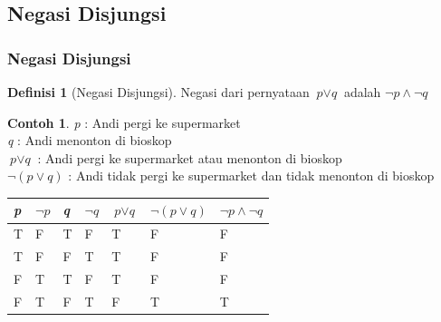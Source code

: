\documentclass[handout]{beamer}
\theoremstyle{definition}
\newtheorem{definisi}[theorem]{Definisi}
\theoremstyle{example}
\newtheorem{contoh}[theorem]{Contoh}
\begin{document}
\subsection{Negasi Disjungsi}
\begin{frame}
	\frametitle{Negasi Disjungsi}
    \begin{definisi}[Negasi Disjungsi]
    	Negasi dari pernyataan $\textit{p}\vee\textit{q}$  adalah $\neg\textit{p}\wedge\neg\textit{q}$    		 	
    \end{definisi}
    \begin{contoh}
    	\textit{p} : Andi pergi ke supermarket \\
    	\textit{q} : Andi menonton di bioskop \\
    	$\textit{p}\vee\textit{q}$ : Andi pergi ke supermarket atau menonton di bioskop\\
    	$\neg(\textit{p}\vee\textit{q})$ : Andi tidak pergi ke supermarket dan tidak menonton di bioskop	\\
    	
    	\begin{tabular}{ | l | l | l | l | l | l | l |}
    		\hline
    		\textit{p} & $\neg\textit{p}$ & \textit{q} & $\neg\textit{q}$ & $\textit{p}\vee\textit{q}$ & $\neg(\textit{p}\vee\textit{q})$ & $\neg\textit{p}\wedge\neg\textit{q}$ \\ \hline
    		T & F & T & F & T & F & F\\ \hline
    		T & F & F & T & T & F & F \\ \hline
    		F & T & T & F & T & F & F\\ \hline
    		F & T & F & T & F & T & T\\     		 
    		\hline
    	\end{tabular}
    \end{contoh}
\end{frame}
\end{document}

